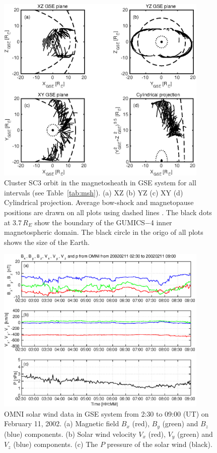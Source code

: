 \documentclass[draft]{agujournal2019}
\begin{document}
\begin{figure}[h]
\centering
\includegraphics[width=0.9\textwidth,angle=0]{swe-2021SW002807-f06} 
\caption{Cluster SC3 orbit in the magnetosheath in GSE system for all intervals (see Table~\ref{tab:msh}). (a) XZ (b) YZ (c) XY (d) Cylindrical projection. Average bow-shock and magnetopause positions are drawn on all plots using dashed lines \cite[respectively]{peredo95:_three_alfven_mach,tsyganenko95:_model_earth}. The black dots at $3.7\,R_E$ show the boundary of the GUMICS$-$4 inner magnetospheric domain. The black circle in the origo of all plots shows the size of the Earth.}
\label{fig:mshorbit}
\end{figure}

\pagebreak

\begin{figure}[h]
\centering
\includegraphics[width=0.9\textwidth,angle=0]{swe-2021SW002807-f07} 
\caption{OMNI solar wind data in GSE system from 2:30 to 09:00 (UT) on February 11, 2002. (a) Magnetic field $B_{x}$ (red), $B_{y}$ (green) and $B_{z}$ (blue) components. (b) Solar wind velocity $V_{x}$ (red), $V_{y}$ (green) and $V_{z}$ (blue) components. (c) The $P$ pressure of the solar wind (black).}
\label{fig:mshomni}
\end{figure}
\end{document}
